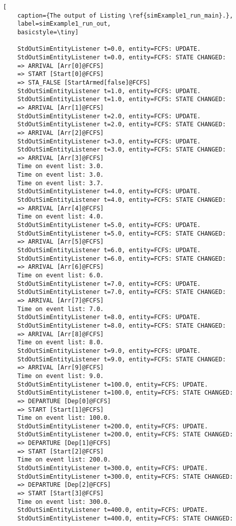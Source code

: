 \begin{lstfloat}
	\begin{lstlisting}[
	caption={The output of Listing \ref{simExample1_run_main}.},
	label=simExample1_run_out,
	basicstyle=\tiny]
	
	StdOutSimEntityListener t=0.0, entity=FCFS: UPDATE.
	StdOutSimEntityListener t=0.0, entity=FCFS: STATE CHANGED:
	=> ARRIVAL [Arr[0]@FCFS]
	=> START [Start[0]@FCFS]
	=> STA_FALSE [StartArmed[false]@FCFS]
	StdOutSimEntityListener t=1.0, entity=FCFS: UPDATE.
	StdOutSimEntityListener t=1.0, entity=FCFS: STATE CHANGED:
	=> ARRIVAL [Arr[1]@FCFS]
	StdOutSimEntityListener t=2.0, entity=FCFS: UPDATE.
	StdOutSimEntityListener t=2.0, entity=FCFS: STATE CHANGED:
	=> ARRIVAL [Arr[2]@FCFS]
	StdOutSimEntityListener t=3.0, entity=FCFS: UPDATE.
	StdOutSimEntityListener t=3.0, entity=FCFS: STATE CHANGED:
	=> ARRIVAL [Arr[3]@FCFS]
	Time on event list: 3.0.
	Time on event list: 3.0.
	Time on event list: 3.7.
	StdOutSimEntityListener t=4.0, entity=FCFS: UPDATE.
	StdOutSimEntityListener t=4.0, entity=FCFS: STATE CHANGED:
	=> ARRIVAL [Arr[4]@FCFS]
	Time on event list: 4.0.
	StdOutSimEntityListener t=5.0, entity=FCFS: UPDATE.
	StdOutSimEntityListener t=5.0, entity=FCFS: STATE CHANGED:
	=> ARRIVAL [Arr[5]@FCFS]
	StdOutSimEntityListener t=6.0, entity=FCFS: UPDATE.
	StdOutSimEntityListener t=6.0, entity=FCFS: STATE CHANGED:
	=> ARRIVAL [Arr[6]@FCFS]
	Time on event list: 6.0.
	StdOutSimEntityListener t=7.0, entity=FCFS: UPDATE.
	StdOutSimEntityListener t=7.0, entity=FCFS: STATE CHANGED:
	=> ARRIVAL [Arr[7]@FCFS]
	Time on event list: 7.0.
	StdOutSimEntityListener t=8.0, entity=FCFS: UPDATE.
	StdOutSimEntityListener t=8.0, entity=FCFS: STATE CHANGED:
	=> ARRIVAL [Arr[8]@FCFS]
	Time on event list: 8.0.
	StdOutSimEntityListener t=9.0, entity=FCFS: UPDATE.
	StdOutSimEntityListener t=9.0, entity=FCFS: STATE CHANGED:
	=> ARRIVAL [Arr[9]@FCFS]
	Time on event list: 9.0.
	StdOutSimEntityListener t=100.0, entity=FCFS: UPDATE.
	StdOutSimEntityListener t=100.0, entity=FCFS: STATE CHANGED:
	=> DEPARTURE [Dep[0]@FCFS]
	=> START [Start[1]@FCFS]
	Time on event list: 100.0.
	StdOutSimEntityListener t=200.0, entity=FCFS: UPDATE.
	StdOutSimEntityListener t=200.0, entity=FCFS: STATE CHANGED:
	=> DEPARTURE [Dep[1]@FCFS]
	=> START [Start[2]@FCFS]
	Time on event list: 200.0.
	StdOutSimEntityListener t=300.0, entity=FCFS: UPDATE.
	StdOutSimEntityListener t=300.0, entity=FCFS: STATE CHANGED:
	=> DEPARTURE [Dep[2]@FCFS]
	=> START [Start[3]@FCFS]
	Time on event list: 300.0.
	StdOutSimEntityListener t=400.0, entity=FCFS: UPDATE.
	StdOutSimEntityListener t=400.0, entity=FCFS: STATE CHANGED:

\end{lstlisting}
\end{lstfloat}
